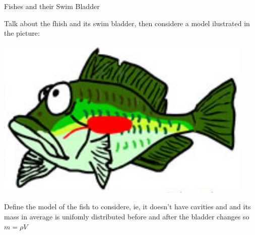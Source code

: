 \begin{section}{Fishes and their Swim Bladder}

    Talk about the fhish and its swim bladder, then considere a model ilustrated in the picture:
    
    \begin{center}
        \includegraphics[scale=0.35]{./pics/fish_bladder.jpg}
    \end{center}
    
    Define the model of the fish to considere, ie, it doesn't have cavities and and its mass in 
    average is unifomly distributed before and after the bladder changes so $ m = \rho V$
\end{section}
